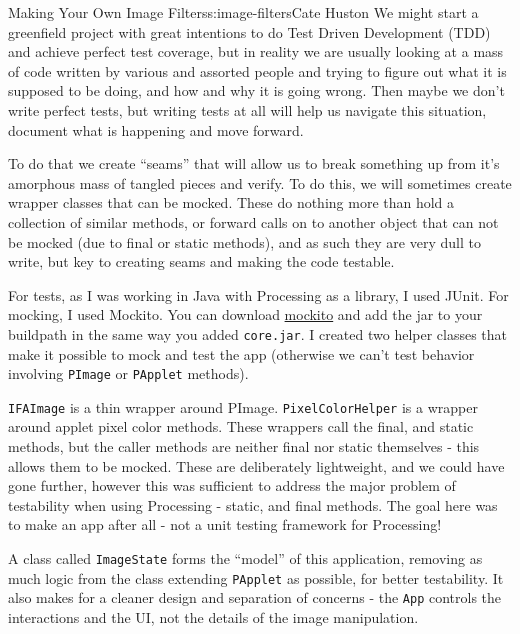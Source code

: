 \begin{aosachapter}{Making Your Own Image Filters}{s:image-filters}{Cate Huston}
We might start a greenfield project with great intentions to do Test
Driven Development (TDD) and achieve perfect test coverage, but in
reality we are usually looking at a mass of code written by various and
assorted people and trying to figure out what it is supposed to be
doing, and how and why it is going wrong. Then maybe we don't write
perfect tests, but writing tests at all will help us navigate this
situation, document what is happening and move forward.

To do that we create ``seams'' that will allow us to break something up
from it's amorphous mass of tangled pieces and verify. To do this, we
will sometimes create wrapper classes that can be mocked. These do
nothing more than hold a collection of similar methods, or forward calls
on to another object that can not be mocked (due to final or static
methods), and as such they are very dull to write, but key to creating
seams and making the code testable.

For tests, as I was working in Java with Processing as a library, I used
JUnit. For mocking, I used Mockito. You can download
\href{https://code.google.com/p/mockito/downloads/list}{mockito} and add
the jar to your buildpath in the same way you added \texttt{core.jar}. I
created two helper classes that make it possible to mock and test the
app (otherwise we can't test behavior involving \texttt{PImage} or
\texttt{PApplet} methods).

\texttt{IFAImage} is a thin wrapper around PImage.
\texttt{PixelColorHelper} is a wrapper around applet pixel color
methods. These wrappers call the final, and static methods, but the
caller methods are neither final nor static themselves - this allows
them to be mocked. These are deliberately lightweight, and we could have
gone further, however this was sufficient to address the major problem
of testability when using Processing - static, and final methods. The
goal here was to make an app after all - not a unit testing framework
for Processing!

A class called \texttt{ImageState} forms the ``model'' of this
application, removing as much logic from the class extending
\texttt{PApplet} as possible, for better testability. It also makes for
a cleaner design and separation of concerns - the \texttt{App} controls
the interactions and the UI, not the details of the image manipulation.

\label{do-it-yourself-filters}

\label{rgb-filters}


\end{aosachapter}
